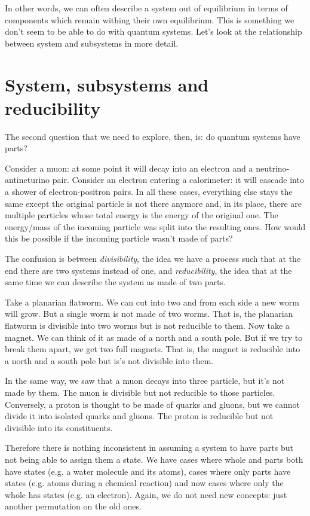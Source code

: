 \documentclass[letterpaper]{article}
\theoremstyle{plain}%
\theoremstyle{definition}
\theoremstyle{remark}
\begin{document}
In other words, we can often describe a system out of equilibrium in terms of components which remain withing their own equilibrium. This is something we don't seem to be able to do with quantum systems. Let's look at the relationship between system and subsystems in more detail.

\section{System, subsystems and reducibility}

The second question that we need to explore, then, is: do quantum systems have parts?

Consider a muon: at some point it will decay into an electron and a neutrino-antineturino pair. Consider an electron entering a calorimeter: it will cascade into a shower of electron-positron pairs. In all these cases, everything else stays the same except the original particle is not there anymore and, in its place, there are multiple particles whose total energy is the energy of the original one. The energy/mass of the incoming particle was split into the resulting ones. How would this be possible if the incoming particle wasn't made of parts?

The confusion is between \textit{divisibility}, the idea we have a process such that at the end there are two systems instead of one, and \textit{reducibility}, the idea that at the same time we can describe the system as made of two parts.

Take a planarian flatworm. We can cut into two and from each side a new worm will grow. But a single worm is not made of two worms. That is, the planarian flatworm is divisible into two worms but is not reducible to them. Now take a magnet. We can think of it as made of a north and a south pole. But if we try to break them apart, we get two full magnets. That is, the magnet is reducible into a north and a south pole but is's not divisible into them.

In the same way, we saw that a muon decays into three particle, but it's not made by them. The muon is divisible but not reducible to those particles. Conversely, a proton is thought to be made of quarks and gluons, but we cannot divide it into isolated quarks and gluons. The proton is reducible but not divisible into its constituents.

Therefore there is nothing inconsistent in assuming a system to have parts but not being able to assign them a state. We have cases where whole and parts both have states (e.g. a water molecule and its atoms), cases where only parts have states (e.g. atoms during a chemical reaction) and now cases where only the whole has states (e.g. an electron). Again, we do not need new concepts: just another permutation on the old ones.
\end{document}
